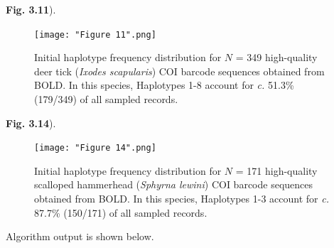 \textbf{Fig. 3.11}). 


\begin{figure}[H]

\centering

\texttt{[image: "Figure 11".png]}

\caption[Haplotype frequency distribution for Deer tick (\textit{Ixodes scapularis}).]{Initial haplotype frequency distribution for $N$ = 349 high-quality deer tick (\textit{Ixodes scapularis}) COI barcode sequences obtained from BOLD. In this species, Haplotypes 1-8 account for \textit{c.} 51.3\% (179/349) of all sampled records.}


\end{figure}


\textbf{Fig. 3.14}).


\begin{figure}[H]

\centering

\texttt{[image: "Figure 14".png]}

\caption[Haplotype frequency distribution for Scalloped hammerhead (\textit{Sphyrna lewini}).]{Initial haplotype frequency distribution for $N$ = 171 high-quality scalloped hammerhead (\textit{Sphyrna lewini}) COI barcode sequences obtained from BOLD. In this species, Haplotypes 1-3 account for \textit{c.} 87.7\% (150/171) of all sampled records.}


\end{figure}
 

Algorithm output is shown below. 


\vspace{3mm}


